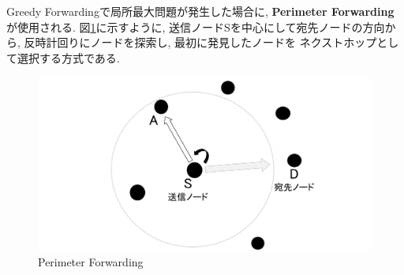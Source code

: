 \indent Greedy Forwardingで局所最大問題が発生した場合に, 
\textbf{Perimeter Forwarding}が使用される. 
図\ref{fig:perimeter}に示すように, 送信ノードSを中心にして宛先ノードの方向から,  
反時計回りにノードを探索し, 最初に発見したノードを
ネクストホップとして選択する方式である.

\begin{figure}
  \centering
  \includegraphics[scale=0.75]{figures/perimeter.png}
  \caption{Perimeter Forwarding}
  \label{fig:perimeter}
\end{figure}